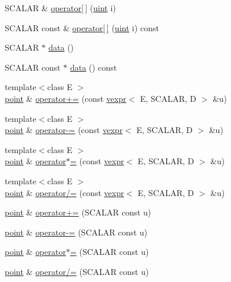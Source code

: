 \begin{DoxyCompactItemize}
\item 
S\+C\+A\+L\+AR \& \hyperlink{structmui_1_1point_a935bfe6fb4ef5bb8ab5f05500eee9b66}{operator\mbox{[}$\,$\mbox{]}} (\hyperlink{namespacemui_af15a3e7188a2117fb9965277bb0cacd2}{uint} i)
\item 
S\+C\+A\+L\+AR const  \& \hyperlink{structmui_1_1point_ab12e0d42a9be6a99e4eb43738a6aab16}{operator\mbox{[}$\,$\mbox{]}} (\hyperlink{namespacemui_af15a3e7188a2117fb9965277bb0cacd2}{uint} i) const
\item 
S\+C\+A\+L\+AR $\ast$ \hyperlink{structmui_1_1point_ad5ad0ad637095c32d706442b0ce93160}{data} ()
\item 
S\+C\+A\+L\+AR const  $\ast$ \hyperlink{structmui_1_1point_a04e09e6c8e45ed86a0574f4a3c8a0318}{data} () const
\item 
{\footnotesize template$<$class E $>$ }\\\hyperlink{structmui_1_1point}{point} \& \hyperlink{structmui_1_1point_a2a082b171b161933d516f4ba8a22689d}{operator+=} (const \hyperlink{structmui_1_1vexpr}{vexpr}$<$ E, S\+C\+A\+L\+AR, D $>$ \&u)
\item 
{\footnotesize template$<$class E $>$ }\\\hyperlink{structmui_1_1point}{point} \& \hyperlink{structmui_1_1point_a4f68652b19c5441d681c73cc319dc34a}{operator-\/=} (const \hyperlink{structmui_1_1vexpr}{vexpr}$<$ E, S\+C\+A\+L\+AR, D $>$ \&u)
\item 
{\footnotesize template$<$class E $>$ }\\\hyperlink{structmui_1_1point}{point} \& \hyperlink{structmui_1_1point_ab3ad1cc267f700bd30669325e6a44af4}{operator$\ast$=} (const \hyperlink{structmui_1_1vexpr}{vexpr}$<$ E, S\+C\+A\+L\+AR, D $>$ \&u)
\item 
{\footnotesize template$<$class E $>$ }\\\hyperlink{structmui_1_1point}{point} \& \hyperlink{structmui_1_1point_ae7cc6eb9f7423ed986b994e545b5dcc3}{operator/=} (const \hyperlink{structmui_1_1vexpr}{vexpr}$<$ E, S\+C\+A\+L\+AR, D $>$ \&u)
\item 
\hyperlink{structmui_1_1point}{point} \& \hyperlink{structmui_1_1point_a721e3c71d63fea2975ad9065758a676a}{operator+=} (S\+C\+A\+L\+AR const u)
\item 
\hyperlink{structmui_1_1point}{point} \& \hyperlink{structmui_1_1point_a7a84447857c9bb1b2690ad4b1e6c43da}{operator-\/=} (S\+C\+A\+L\+AR const u)
\item 
\hyperlink{structmui_1_1point}{point} \& \hyperlink{structmui_1_1point_a567ca354b75a46e38c06eb956dc3504d}{operator$\ast$=} (S\+C\+A\+L\+AR const u)
\item 
\hyperlink{structmui_1_1point}{point} \& \hyperlink{structmui_1_1point_a4dfed783ae0be1778b544d415ece44da}{operator/=} (S\+C\+A\+L\+AR const u)
\end{DoxyCompactItemize}
